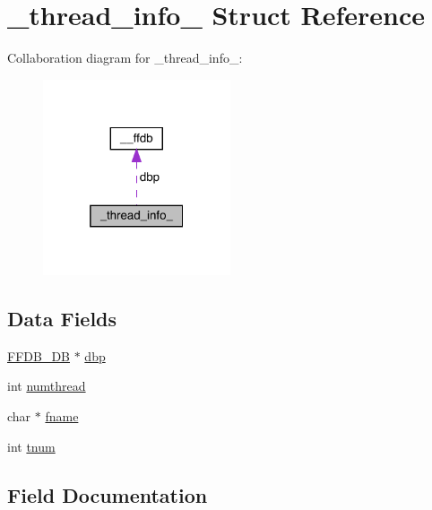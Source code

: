 \hypertarget{struct__thread__info__}{}\section{\+\_\+thread\+\_\+info\+\_\+ Struct Reference}
\label{struct__thread__info__}


Collaboration diagram for \+\_\+thread\+\_\+info\+\_\+\+:\nopagebreak
\begin{figure}[H]
\begin{center}
\leavevmode
\includegraphics[width=157pt]{dd/d6a/struct__thread__info____coll__graph}
\end{center}
\end{figure}
\subsection*{Data Fields}
\begin{DoxyCompactItemize}
\item 
\mbox{\hyperlink{adat-devel_2other__libs_2filedb_2filehash_2ffdb__db_8h_a0b27b956926453a7a8141ea8e10f0df8}{F\+F\+D\+B\+\_\+\+DB}} $\ast$ \mbox{\hyperlink{struct__thread__info___ab5b3890e51ee8c7247a0b8d93046f86c}{dbp}}
\item 
int \mbox{\hyperlink{struct__thread__info___a5cdfeeb0597f6b8b0cc359894fbae6cc}{numthread}}
\item 
char $\ast$ \mbox{\hyperlink{struct__thread__info___a051f9e6150a37182d882ebc1d982fc7a}{fname}}
\item 
int \mbox{\hyperlink{struct__thread__info___a6a6d76906fe855601083b5ca283faf18}{tnum}}
\end{DoxyCompactItemize}


\subsection{Field Documentation}
\mbox{\label{struct__thread__info___ab5b3890e51ee8c7247a0b8d93046f86c}} 
